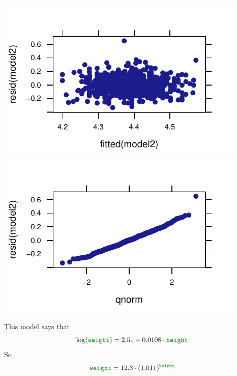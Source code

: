 \documentclass[twoside]{book}\usepackage[]{graphicx}\usepackage[]{xcolor}
\makeatletter
\def\maxwidth{ %
  \ifdim\Gin@nat@width>\linewidth
    \linewidth
  \else
    \Gin@nat@width
  \fi
}
\newenvironment{knitrout}{}{} %
\newcommand{\variable}[1]{{\color{green!50!black}\texttt{#1}}}
\makeatother
\begin{document}
\begin{solution}
\begin{enumerate}
\begin{knitrout}
{\centering \includegraphics[width=\maxwidth]{figures/fig-unnamed-chunk-196-1} 
\includegraphics[width=\maxwidth]{figures/fig-unnamed-chunk-196-2} 

}



\end{knitrout}
This model says that
\[
\log( \variable{weight} ) 
	= 2.51 + 0.0108 \cdot \variable{height}
\]
So
\[
\variable{weight}  
= 12.3 
		\cdot (1.011)^{\variable{height}}
\]
\end{enumerate}
\end{solution}
\end{document}
